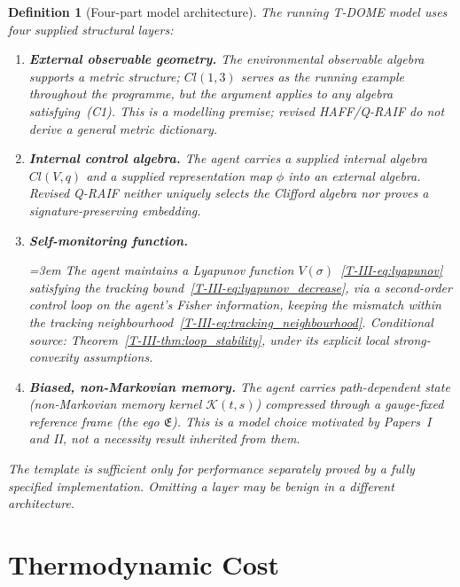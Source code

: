 \documentclass[12pt,a4paper,openany]{book}
\newtheorem{definition}[theorem]{Definition}
\begin{document}
\begin{definition}[Four-part model architecture]
\label{T-III-def:four_part_template}
The running T-DOME model uses four supplied structural layers:
\begin{enumerate}
\item[\textup{(I)}] \textbf{External observable geometry.}
  The environmental observable algebra supports a
  metric structure; $Cl(1,3)$ serves as the running
  example throughout the programme, but the argument
  applies to any algebra satisfying~(C1).
  This is a modelling premise; revised HAFF/Q-RAIF do not derive a
  general metric dictionary.
\item[\textup{(II)}] \textbf{Internal control algebra.}
  The agent carries a supplied internal algebra $Cl(V,q)$ and a
  supplied representation map $\phi$ into an external algebra.
  Revised Q-RAIF neither uniquely selects the Clifford algebra nor
  proves a signature-preserving embedding.
\item[\textup{(III)}] \textbf{Self-monitoring function.}
  {\emergencystretch=3em
  The agent maintains a Lyapunov function
  $V(\sigma)$~\eqref{T-III-eq:lyapunov} satisfying
  the tracking
  bound~\eqref{T-III-eq:lyapunov_decrease},
  via a second-order control loop on the agent's
  Fisher information, keeping the mismatch within
  the tracking
  neighbourhood~\eqref{T-III-eq:tracking_neighbourhood}.
  \emph{Conditional source:} Theorem~\ref{T-III-thm:loop_stability}, under
  its explicit local strong-convexity assumptions.\par}
\item[\textup{(IV)}] \textbf{Biased, non-Markovian memory.}
  The agent carries path-dependent state
  (non-Markovian memory kernel $\mathcal{K}(t,s)$)
  compressed through a gauge-fixed reference frame
  (the ego $\mathfrak{E}$).
  This is a model choice motivated by Papers~I and II, not a necessity
  result inherited from them.
\end{enumerate}
The template is sufficient only for performance separately proved by a
fully specified implementation.  Omitting a layer may be benign in a
different architecture.
\end{definition}

\section{Thermodynamic Cost}
\label{T-III-sec:cost}
\end{document}
